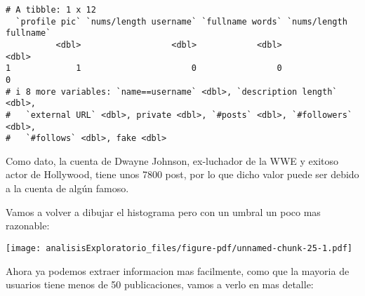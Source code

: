 \documentclass[
  letterpaper,
  DIV=11,
  numbers=noendperiod]{scrreprt}
\newenvironment{Shaded}{\begin{snugshade}}{\end{snugshade}}
\newcommand{\AttributeTok}[1]{\textcolor[rgb]{0.40,0.45,0.13}{#1}}
\newcommand{\DecValTok}[1]{\textcolor[rgb]{0.68,0.00,0.00}{#1}}
\newcommand{\FunctionTok}[1]{\textcolor[rgb]{0.28,0.35,0.67}{#1}}
\newcommand{\NormalTok}[1]{\textcolor[rgb]{0.00,0.23,0.31}{#1}}
\newcommand{\OtherTok}[1]{\textcolor[rgb]{0.00,0.23,0.31}{#1}}
\newcommand{\SpecialCharTok}[1]{\textcolor[rgb]{0.37,0.37,0.37}{#1}}
\newcommand{\StringTok}[1]{\textcolor[rgb]{0.13,0.47,0.30}{#1}}
\begin{document}
\begin{verbatim}
# A tibble: 1 x 12
  `profile pic` `nums/length username` `fullname words` `nums/length fullname`
          <dbl>                  <dbl>            <dbl>                  <dbl>
1             1                      0                0                      0
# i 8 more variables: `name==username` <dbl>, `description length` <dbl>,
#   `external URL` <dbl>, private <dbl>, `#posts` <dbl>, `#followers` <dbl>,
#   `#follows` <dbl>, fake <dbl>
\end{verbatim}

Como dato, la cuenta de Dwayne Johnson, ex-luchador de la WWE y exitoso
actor de Hollywood, tiene unos 7800 post, por lo que dicho valor puede
ser debido a la cuenta de algún famoso.

Vamos a volver a dibujar el histograma pero con un umbral un poco mas
razonable:

\begin{Shaded}
\end{Shaded}

\texttt{[image: analisisExploratorio\_files/figure-pdf/unnamed-chunk-25-1.pdf]}

Ahora ya podemos extraer informacion mas facilmente, como que la mayoria
de usuarios tiene menos de 50 publicaciones, vamos a verlo en mas
detalle:

\begin{Shaded}
\end{Shaded}
\end{document}
